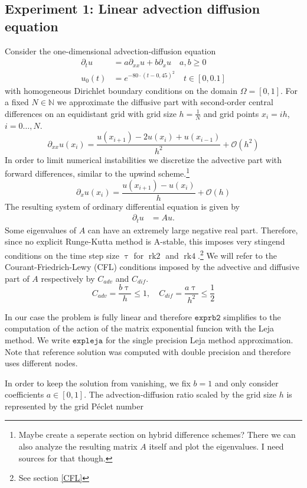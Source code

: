 \documentclass{scrartcl}
\begin{document}
\subsection{Experiment 1: Linear advection diffusion equation}
Consider the one-dimensional advection-diffusion equation
\begin{align*}
\partial_tu &= a\partial_{xx}u + b\partial_xu \quad a,b\ge 0\\
u_0(t) &= e^{-80\cdot(t-0,45)^2} \quad t\in[0,0.1]
\end{align*}
with homogeneous Dirichlet boundary conditions on the domain $\Omega = [0,1]$. 
For a fixed $N\in\mathbb N$ we approximate the diffusive part with second-order central differences on an equidistant grid with grid size $h = \frac{1}{N}$ and grid points $x_i = ih$, $i=0\dots,N$.
\[\partial_{xx}u(x_i) = \frac{u(x_{i+1}) - 2u(x_i) + u(x_{i-1})}{{h}^2} + \mathcal{O}({h}^2)\]
In order to limit numerical instabilities we discretize the advective part with forward differences, similar to the upwind scheme.\footnote{Maybe create a seperate section on hybrid difference schemes? There we can also analyze the resulting matrix $A$ itself and plot the eigenvalues. I need sources for that though.}
\[\partial_{x}u(x_i) = \frac{u(x_{i+1}) - u(x_i)}{h} + \mathcal{O}(h)\]
The resulting system of ordinary differential equation is given by
\begin{align*}
\partial_tu &= Au.
\end{align*} 
Some eigenvalues of $A$ can have an extremely large negative real part. Therefore, since no explicit Runge-Kutta method is A-stable, this imposes very stingend conditions on the time step size $\uptau$ for $\operatorname{rk2}$ and $\operatorname{rk4}$.\footnote{See section \ref{CFL}} We will refer to the Courant-Friedrich-Lewy (CFL) conditions imposed by the advective and diffusive part of $A$ respectively by $C_{adv}$ and $C_{dif}$.  
\[ C_{adv} = \frac{b\uptau}{h} \le 1, \quad C_{dif} = \frac{a\uptau}{h^2} \le \frac{1}{2}\] 



In our case the problem is fully linear and therefore $\texttt{exprb2}$ simplifies to the computation of the action of the matrix exponential funcion with the Leja method. We write $\texttt{expleja}$ for the single precision Leja method approximation. Note that reference solution was computed with double precision and therefore uses different nodes.

In order to keep the solution from vanishing, we fix $b = 1$ and only consider coefficients $a\in[0,1]$. The advection-diffusion ratio scaled by the grid size $h$ is represented by the grid P\'eclet number
\end{document}
